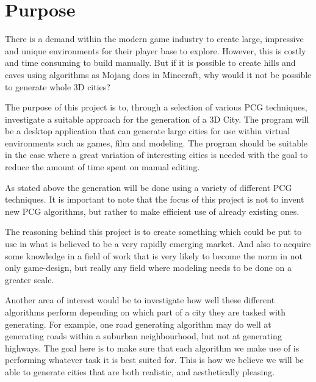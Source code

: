 \section{Purpose}
There is a demand within the modern game industry to create large, impressive and unique environments for their player base to explore.
However, this is costly and time consuming to build manually.
But if it is possible to create hills and caves using algorithms as Mojang does in Minecraft, why would it not be possible to generate whole 3D cities?

The purpose of this project is to, through a selection of various PCG techniques, investigate a suitable approach for the generation of a 3D City.
The program will be a desktop application that can generate large cities for use within virtual environments such as games, film and modeling.
The program should be suitable in the case where a great variation of interesting cities is needed with the goal to reduce the amount of time spent on manual editing.

As stated above the generation will be done using a variety of different PCG techniques. It is important to note that the focus of this project is not to invent new PCG algorithms, but rather to make efficient use of already existing ones. 

The reasoning behind this project is to create something which could be put to use in what is believed to be a very rapidly emerging market. And also to acquire some knowledge in a field of work that is very likely to become the norm in not only game-design, but really any field where modeling needs to be done on a greater scale. 

Another area of interest would be to investigate how well these different algorithms perform
depending on which part of a city they are tasked with generating. For example, one road generating algorithm may do well at generating roads within a suburban neighbourhood, but not at generating highways. The goal here is to make sure that each algorithm we make use of is performing whatever task it is best suited for. This is how we believe we will be able to generate cities that are both realistic, and aesthetically pleasing. 

